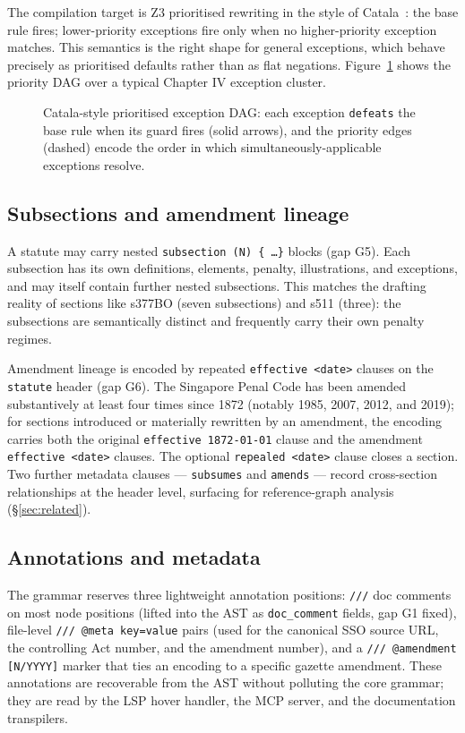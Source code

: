The compilation target is Z3 prioritised rewriting in the style of
Catala~\cite{catala2021}: the base rule fires; lower-priority exceptions
fire only when no higher-priority exception matches. This semantics is
the right shape for general exceptions, which behave precisely as
prioritised defaults rather than as flat negations.
Figure~\ref{fig:exception-priority} shows the priority DAG over a
typical Chapter IV exception cluster.

\begin{figure}[!htbp]
\centering
\resizebox{0.85\columnwidth}{!}{}
\caption{Catala-style prioritised exception DAG: each exception
\texttt{defeats} the base rule when its guard fires (solid arrows),
and the priority edges (dashed) encode the order in which
simultaneously-applicable exceptions resolve.}
\label{fig:exception-priority}
\end{figure}

\subsection{Subsections and amendment lineage}
\label{subsec:subsections}
A statute may carry nested \texttt{subsection (N) \{ \dots \}} blocks
(gap \textsf{G5}). Each subsection has its own definitions, elements,
penalty, illustrations, and exceptions, and may itself contain further
nested subsections. This matches the drafting reality of sections like
s377BO (seven subsections) and s511 (three): the subsections are
semantically distinct and frequently carry their own penalty regimes.

Amendment lineage is encoded by repeated \texttt{effective <date>}
clauses on the \texttt{statute} header (gap \textsf{G6}). The Singapore
Penal Code has been amended substantively at least four times since 1872
(notably 1985, 2007, 2012, and 2019); for sections introduced or
materially rewritten by an amendment, the encoding carries both the
original \texttt{effective 1872-01-01} clause and the amendment
\texttt{effective <date>} clauses. The optional \texttt{repealed <date>}
clause closes a section. Two further metadata clauses --- \texttt{subsumes}
and \texttt{amends} --- record cross-section relationships at the header
level, surfacing for reference-graph analysis (\S\ref{sec:related}).

\subsection{Annotations and metadata}
The grammar reserves three lightweight annotation positions: \texttt{///}
doc comments on most node positions (lifted into the AST as
\texttt{doc\_comment} fields, gap \textsf{G1} fixed), file-level
\texttt{/// @meta key=value} pairs (used for the canonical SSO source
URL, the controlling Act number, and the amendment number), and a
\texttt{/// @amendment [N/YYYY]} marker that ties an encoding to a
specific gazette amendment. These annotations are recoverable from the
AST without polluting the core grammar; they are read by the LSP hover
handler, the MCP server, and the documentation transpilers.


